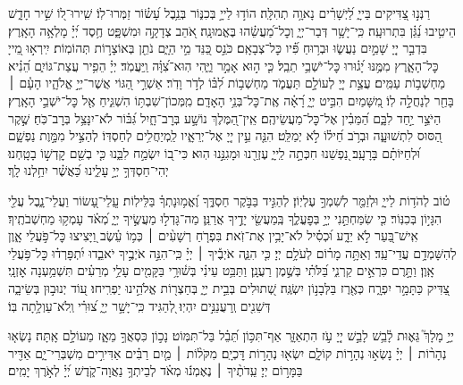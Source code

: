 \documentclass[twoside, openany, parskip=half, 11pt]{book}
\begin{document}
\begin{narrow}
רַנְּנ֣וּ צַ֭דִּיקִים בַּייָ֑
לַ֝יְשָׁרִ֗ים נָאוָ֥ה תְהִלָּֽה׃
הוֹד֣וּ לַייָ֣ בְּכִנּ֑וֹר בְּנֵ֥בֶל עָ֝שׂ֗וֹר זַמְּרוּ־לֽוֹ׃
שִֽׁירוּ־ל֭וֹ שִׁ֣יר חָדָ֑שׁ הֵיטִ֥יבוּ נַ֝גֵּ֗ן בִּתְרוּעָֽה׃
כִּֽי־יָשָׁ֥ר דְּבַר־יְיָ֑ וְכׇל־מַ֝עֲשֵׂ֗הוּ בֶּאֱמוּנָֽה׃
אֹ֭הֵב צְדָקָ֣ה וּמִשְׁפָּ֑ט חֶ֥סֶד יְ֝יָ֗ מָלְאָ֥ה הָאָֽרֶץ׃
בִּדְבַ֣ר יְיָ֭ שָׁמַ֣יִם נַעֲשׂ֑וּ וּבְר֥וּחַ פִּ֗֝יו כׇּל־צְבָאָֽם׃
כֹּנֵ֣ס כַּ֭נֵּד מֵ֣י הַיָּ֑ם נֹתֵ֖ן בְּאוֹצָר֣וֹת תְּהוֹמֽוֹת׃
יִֽירְא֣וּ מֵ֭ייָ כׇּל־הָאָ֑רֶץ מִמֶּ֥נּוּ יָ֝ג֗וּרוּ כׇּל־יֹשְׁבֵ֥י תֵבֵֽל׃
כִּ֤י ה֣וּא אָמַ֣ר וַיֶּ֑הִי הֽוּא־צִ֝וָּ֗ה וַֽיַּעֲמֹֽד׃
יְיָ֗ הֵפִ֥יר עֲצַת־גּוֹיִ֑ם הֵ֝נִ֗יא מַחְשְׁב֥וֹת עַמִּֽים׃
עֲצַ֣ת יְיָ֭ לְעוֹלָ֣ם תַּעֲמֹ֑ד מַחְשְׁב֥וֹת לִ֝בּ֗וֹ לְדֹ֣ר וָדֹֽר׃
אַשְׁרֵ֣י הַ֭גּוֹי אֲשֶׁר־יְיָ֣ אֱלֹהָ֑יו הָעָ֓ם ׀ בָּחַ֖ר לְנַחֲלָ֣ה לֽוֹ׃
מִ֭שָּׁמַיִם הִבִּ֣יט יְיָ֑ רָ֝אָ֗ה אֶֽת־כׇּל־בְּנֵ֥י הָאָדָֽם׃
מִֽמְּכוֹן־שִׁבְתּ֥וֹ הִשְׁגִּ֑יחַ אֶ֖ל כׇּל־יֹשְׁבֵ֣י הָאָֽרֶץ׃
הַיֹּצֵ֣ר יַ֣חַד לִבָּ֑ם הַ֝מֵּבִ֗ין אֶל־כׇּל־מַעֲשֵׂיהֶֽם׃
אֵֽין־הַ֭מֶּלֶךְ נוֹשָׁ֣ע בְּרׇב־חָ֑יִל גִּ֝בּ֗וֹר לֹא־יִנָּצֵ֥ל בְּרׇב־כֹּֽחַ׃
שֶׁ֣קֶר הַ֭סּוּס לִתְשׁוּעָ֑ה וּבְרֹ֥ב חֵ֝יל֗וֹ לֹ֣א יְמַלֵּֽט׃
הִנֵּ֤ה עֵ֣ין יְיָ֭ אֶל־יְרֵאָ֑יו לַֽמְיַחֲלִ֥ים לְחַסְדּֽוֹ׃
לְהַצִּ֣יל מִמָּ֣וֶת נַפְשָׁ֑ם וּ֝לְחַיּוֹתָ֗ם בָּרָעָֽב׃
נַ֭פְשֵׁנוּ חִכְּתָ֣ה לַֽייָ֑ עֶזְרֵ֖נוּ וּמָגִנֵּ֣נוּ הֽוּא׃
כִּי־ב֭וֹ יִשְׂמַ֣ח לִבֵּ֑נוּ כִּ֤י בְשֵׁ֖ם קׇדְשׁ֣וֹ בָטָֽחְנוּ׃
יְהִי־חַסְדְּךָ֣ יְיָ֣ עָלֵ֑ינוּ כַּ֝אֲשֶׁ֗ר יִחַ֥לְנוּ לָֽךְ׃
\end{narrow}
\newcommand{\mizmorshabbat}{
\firstword{מִזְמ֥וֹר שִׁ֗יר לְי֣וֹם הַשַּׁבָּֽת׃}\source{תהלים צב}
ט֗וֹב לְהֹד֥וֹת לַייָ֑ וּלְזַמֵּ֖ר לְשִׁמְךָ֣ עֶלְיֽוֹן׃
לְהַגִּ֣יד בַּבֹּ֣קֶר חַסְדֶּ֑ךָ וֶ֝אֱמ֥וּנָתְךָ֗ בַּלֵּילֽוֹת׃
עֲֽלֵי־עָ֭שׂוֹר וַעֲלֵי־נָ֑בֶל עֲלֵ֖י הִגָּי֣וֹן בְּכִנּֽוֹר׃
כִּ֤י שִׂמַּחְתַּ֣נִי יְיָ֣ בְּפׇעֳלֶ֑ךָ בְּֽמַעֲשֵׂ֖י יָדֶ֣יךָ אֲרַנֵּֽן׃
מַה־גָּדְל֣וּ מַעֲשֶׂ֣יךָ יְיָ֑ מְ֝אֹ֗ד עָמְק֥וּ מַחְשְׁבֹתֶֽיךָ׃
אִֽישׁ־בַּ֭עַר לֹ֣א יֵדָ֑ע וּ֝כְסִ֗יל לֹא־יָבִ֥ין אֶת־זֹֽאת׃
בִּפְרֹ֤חַ רְשָׁעִ֨ים ׀ כְּמ֥וֹ עֵ֗שֶׂב וַ֭יָּצִיצוּ כׇּל־פֹּ֣עֲלֵי אָ֑וֶן לְהִשָּׁמְדָ֥ם עֲדֵי־עַֽד׃
וְאַתָּ֥ה מָר֗וֹם לְעֹלָ֥ם יְיָ׃
כִּ֤י הִנֵּ֪ה אֹיְבֶ֡יךָ ׀ יְיָ֗ כִּֽי־הִנֵּ֣ה אֹיְבֶ֣יךָ יֹאבֵ֑דוּ יִ֝תְפָּרְד֗וּ כׇּל־פֹּ֥עֲלֵי אָֽוֶן׃
וַתָּ֣רֶם כִּרְאֵ֣ים קַרְנִ֑י בַּ֝לֹּתִ֗י בְּשֶׁ֣מֶן רַעֲנָֽן׃
וַתַּבֵּ֥ט עֵינִ֗י בְּשׁ֫וּרָ֥י בַּקָּמִ֖ים עָלַ֥י מְרֵעִ֗ים תִּשְׁמַ֥עְנָה אׇזְנָֽי׃
צַ֭דִּיק כַּתָּמָ֣ר יִפְרָ֑ח כְּאֶ֖רֶז בַּלְּבָנ֣וֹן יִשְׂגֶּֽה׃
שְׁ֭תוּלִים בְּבֵ֣ית יְיָ֑ בְּחַצְר֖וֹת אֱלֹהֵ֣ינוּ יַפְרִֽיחוּ׃
ע֭וֹד יְנוּב֣וּן בְּשֵׂיבָ֑ה דְּשֵׁנִ֖ים וְֽרַעֲנַנִּ֣ים יִהְיֽוּ׃
לְ֭הַגִּיד כִּֽי־יָשָׁ֣ר יְיָ֑ צ֝וּרִ֗י וְֽלֹא־עַוְלָ֥תָה בּֽוֹ׃
}
\begin{narrow}
\mizmorshabbat

יְיָ֣ מָלָךְ֮ גֵּא֢וּת לָ֫בֵ֥שׁ
לָבֵ֣שׁ יְיָ֭ עֹ֣ז הִתְאַזָּ֑ר אַף־תִּכּ֥וֹן תֵּ֝בֵ֗ל בַּל־תִּמּֽוֹט׃
נָכ֣וֹן כִּסְאֲךָ֣ מֵאָ֑ז מֵעוֹלָ֣ם אָֽתָּה׃
נָשְׂא֤וּ נְהָר֨וֹת ׀ יְיָ֗ נָשְׂא֣וּ נְהָר֣וֹת קוֹלָ֑ם יִשְׂא֖וּ נְהָר֣וֹת דׇּכְיָֽם׃
מִקֹּל֨וֹת ׀ מַ֤יִם רַבִּ֗ים אַדִּירִ֣ים מִשְׁבְּרֵי־יָ֑ם אַדִּ֖יר בַּמָּר֣וֹם יְיָ׃
עֵֽדֹתֶ֨יךָ ׀ נֶאֶמְנ֬וּ מְאֹ֗ד לְבֵיתְךָ֥ נַאֲוָה־קֹ֑דֶשׁ יְ֝יָ֗ לְאֹ֣רֶךְ יָמִֽים׃

\end{narrow}
\end{document}
